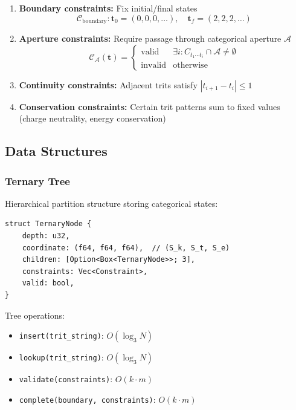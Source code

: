 \begin{enumerate}
\item \textbf{Boundary constraints:} Fix initial/final states
\begin{equation}
\mathcal{C}_{\text{boundary}}: \mathbf{t}_0 = (0,0,0,\ldots), \quad \mathbf{t}_f = (2,2,2,\ldots)
\end{equation}

\item \textbf{Aperture constraints:} Require passage through categorical aperture $\mathcal{A}$
\begin{equation}
\mathcal{C}_{\mathcal{A}}(\mathbf{t}) = \begin{cases}
\text{valid} & \exists i: C_{t_1 \cdots t_i} \cap \mathcal{A} \neq \emptyset \\
\text{invalid} & \text{otherwise}
\end{cases}
\end{equation}

\item \textbf{Continuity constraints:} Adjacent trits satisfy $|t_{i+1} - t_i| \leq 1$

\item \textbf{Conservation constraints:} Certain trit patterns sum to fixed values (charge neutrality, energy conservation)
\end{enumerate}

\subsection{Data Structures}

\subsubsection{Ternary Tree}

Hierarchical partition structure storing categorical states:

\begin{verbatim}
struct TernaryNode {
    depth: u32,
    coordinate: (f64, f64, f64),  // (S_k, S_t, S_e)
    children: [Option<Box<TernaryNode>>; 3],
    constraints: Vec<Constraint>,
    valid: bool,
}
\end{verbatim}

Tree operations:
\begin{itemize}
\item \texttt{insert(trit\_string)}: $O(\log_3 N)$
\item \texttt{lookup(trit\_string)}: $O(\log_3 N)$
\item \texttt{validate(constraints)}: $O(k \cdot m)$
\item \texttt{complete(boundary, constraints)}: $O(k \cdot m)$
\end{itemize}


